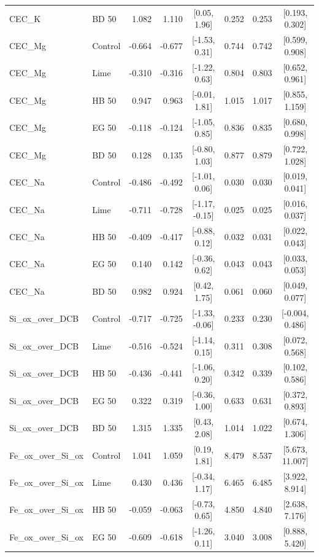 \documentclass[preprint,12pt]{elsarticle}
\begin{document}
\begin{landscape}
\begin{longtable}{@{} >{\raggedright\arraybackslash}p{4.3cm} l r r c r r c @{}}
CEC\_K & BD 50 & 1.082 & 1.110 & [0.05, 1.96] & 0.252 & 0.253 & [0.193, 0.302] \\
CEC\_Mg & Control & -0.664 & -0.677 & [-1.53, 0.31] & 0.744 & 0.742 & [0.599, 0.908] \\
CEC\_Mg & Lime & -0.310 & -0.316 & [-1.22, 0.63] & 0.804 & 0.803 & [0.652, 0.961] \\
CEC\_Mg & HB 50 & 0.947 & 0.963 & [-0.01, 1.81] & 1.015 & 1.017 & [0.855, 1.159] \\
CEC\_Mg & EG 50 & -0.118 & -0.124 & [-1.05, 0.85] & 0.836 & 0.835 & [0.680, 0.998] \\
CEC\_Mg & BD 50 & 0.128 & 0.135 & [-0.80, 1.03] & 0.877 & 0.879 & [0.722, 1.028] \\
CEC\_Na & Control & -0.486 & -0.492 & [-1.01, 0.06] & 0.030 & 0.030 & [0.019, 0.041] \\
CEC\_Na & Lime & -0.711 & -0.728 & [-1.17, -0.15] & 0.025 & 0.025 & [0.016, 0.037] \\
CEC\_Na & HB 50 & -0.409 & -0.417 & [-0.88, 0.12] & 0.032 & 0.031 & [0.022, 0.043] \\
CEC\_Na & EG 50 & 0.140 & 0.142 & [-0.36, 0.62] & 0.043 & 0.043 & [0.033, 0.053] \\
CEC\_Na & BD 50 & 0.982 & 0.924 & [0.42, 1.75] & 0.061 & 0.060 & [0.049, 0.077] \\
Si\_ox\_over\_DCB & Control & -0.717 & -0.725 & [-1.33, -0.06] & 0.233 & 0.230 & [-0.004, 0.486] \\
Si\_ox\_over\_DCB & Lime & -0.516 & -0.524 & [-1.14, 0.15] & 0.311 & 0.308 & [0.072, 0.568] \\
Si\_ox\_over\_DCB & HB 50 & -0.436 & -0.441 & [-1.06, 0.20] & 0.342 & 0.339 & [0.102, 0.586] \\
Si\_ox\_over\_DCB & EG 50 & 0.322 & 0.319 & [-0.36, 1.00] & 0.633 & 0.631 & [0.372, 0.893] \\
Si\_ox\_over\_DCB & BD 50 & 1.315 & 1.335 & [0.43, 2.08] & 1.014 & 1.022 & [0.674, 1.306] \\
Fe\_ox\_over\_Si\_ox & Control & 1.041 & 1.059 & [0.19, 1.81] & 8.479 & 8.537 & [5.673, 11.007] \\
Fe\_ox\_over\_Si\_ox & Lime & 0.430 & 0.436 & [-0.34, 1.17] & 6.465 & 6.485 & [3.922, 8.914] \\
Fe\_ox\_over\_Si\_ox & HB 50 & -0.059 & -0.063 & [-0.73, 0.65] & 4.850 & 4.840 & [2.638, 7.176] \\
Fe\_ox\_over\_Si\_ox & EG 50 & -0.609 & -0.618 & [-1.26, 0.11] & 3.040 & 3.008 & [0.888, 5.420] \\

\end{longtable}
\end{landscape}
\end{document}
